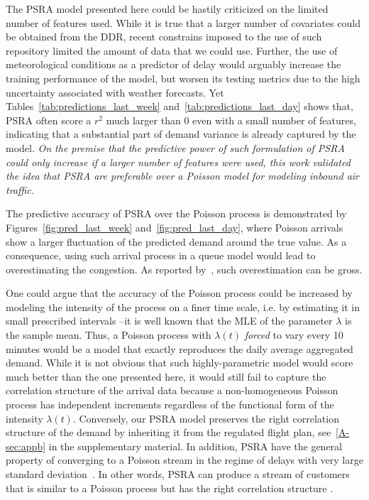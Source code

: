 \documentclass[draft,review]{elsarticle}
\makeatletter
\newcommand*{\ie}{i.e.\@\xspace}
\makeatother
\begin{document}
  The \ac{PSRA} model presented here could be hastily criticized on the limited number of features used.
  While it is true that a larger number of covariates could be obtained from the \ac{DDR}, recent constrains imposed to the use of such repository limited the amount of data that we could use.
  Further, the use of meteorological conditions as a predictor of delay would arguably increase the training performance of the model, but worsen its testing metrics due to the high uncertainty associated with weather forecasts.
  Yet Tables~\ref{tab:predictions_last_week} and~\ref{tab:predictions_last_day} shows that, \ac{PSRA} often score a \(r^2\) much larger than 0 even with a small number of features, indicating that a substantial part of demand variance is already captured by the model.
  \emph{On the premise that the predictive power of such formulation of \ac{PSRA} could only increase if a larger number of features were used, this work validated the idea that \ac{PSRA} are preferable over a Poisson model for modeling inbound air traffic.}

  The predictive accuracy of \ac{PSRA} over the Poisson process is demonstrated by Figures~\ref{fig:pred_last_week} and~\ref{fig:pred_last_day}, where Poisson arrivals show a larger fluctuation of the predicted demand around the true value.
  As a consequence, using such arrival process in a queue model would lead to overestimating the congestion.
  As reported by~\citet{caccavale2014model}, such overestimation can be gross.

  One could argue that the accuracy of the Poisson process could be increased by modeling the intensity of the process on a finer time scale, \ie{} by estimating it in small prescribed intervals --it is well known that the \ac{MLE} of the parameter \(\lambda\) is the sample mean.
  Thus, a Poisson process with \(\lambda(t)\) \emph{forced} to vary every 10 minutes would be a model that exactly reproduces the daily average aggregated demand.
  While it is not obvious that such highly-parametric model would score much better than the one presented here, it would still fail to capture the correlation structure of the arrival data because a non-homogeneous Poisson process has independent increments regardless of the functional form of the intensity \(\lambda(t)\).
  Conversely, our \ac{PSRA} model preserves the right correlation structure of the demand by inheriting it from the regulated flight plan, see~\ref{A-sec:appb} in the supplementary material.
  In addition, \ac{PSRA} have the general property of converging to a Poisson stream in the regime of delays with very large standard deviation~\citep{guadagni2011queueing}. In other words, PSRA can produce a stream of customers that is similar to a Poisson process but has the right correlation structure .
\end{document}
